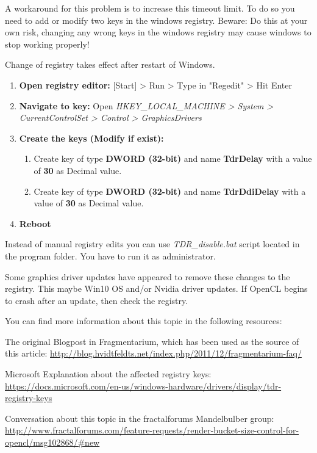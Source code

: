 A workaround for this problem is to increase this timeout limit. To do so you need to add or modify two keys in the windows registry. Beware: Do this at your own risk, changing any wrong keys in the windows registry may cause windows to stop working properly!

Change of registry takes effect after restart of Windows.

\begin{enumerate}
	
	\item \textbf{Open registry editor:} [Start] > Run > Type in "Regedit" > Hit Enter
	\item \textbf{Navigate to key:} Open \emph{HKEY\_LOCAL\_MACHINE > System > CurrentControlSet > Control > GraphicsDrivers}
	\item \textbf{Create the keys (Modify if exist):}
	\begin{enumerate}
		\item Create key of type \textbf{DWORD (32-bit)} and name \textbf{TdrDelay} with a value of \textbf{30} as Decimal value.
		\item Create key of type \textbf{DWORD (32-bit)} and name \textbf{TdrDdiDelay} with a value of \textbf{30} as Decimal value.	
	\end{enumerate}	
	\item \textbf{Reboot}

\end{enumerate}

Instead of manual registry edits you can use \emph{TDR\_disable.bat} script located in the program folder. You have to run it as administrator.

Some graphics driver updates have appeared to remove these changes to the registry. This maybe Win10 OS and/or Nvidia driver updates. If OpenCL begins to crash after an update, then check the registry.

You can find more information about this topic in the following resources:

The original Blogpost in Fragmentarium, which has been used as the source of this article: \url{http://blog.hvidtfeldts.net/index.php/2011/12/fragmentarium-faq/}

Microsoft Explanation about the affected registry keys: \url{https://docs.microsoft.com/en-us/windows-hardware/drivers/display/tdr-registry-keys}

Conversation about this topic in the fractalforums Mandelbulber group:
\url{http://www.fractalforums.com/feature-requests/render-bucket-size-control-for-opencl/msg102868/#new}

